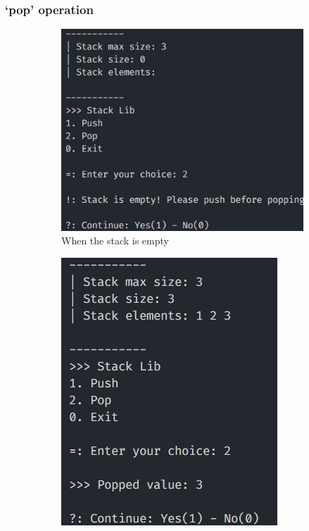 \subsubsection*{`pop' operation}
\begin{figure}[!ht]
	\centering
	\begin{subfigure}{0.58\textwidth}
		\centering
		\includegraphics[width=\textwidth]{imgs/StackArray/pop/empty.png}
		\caption{When the stack is empty}\label{fig:stack_arr_pop_empty}
	\end{subfigure}
	\hfill
	\begin{subfigure}{0.39\textwidth}
		\centering
		\includegraphics[width=\textwidth]{imgs/StackArray/pop/normal.png}

\end{subfigure}
\end{figure}
